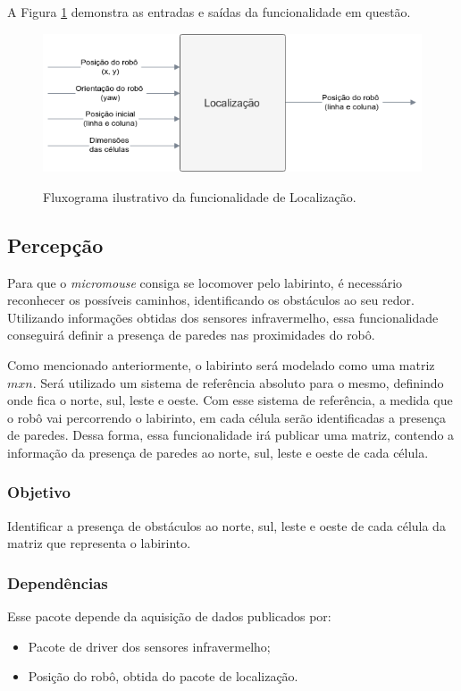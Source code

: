 A Figura \ref{fig:especificacao_funcional_localizacao} demonstra as entradas e saídas da funcionalidade em questão.

\begin{figure}[H]
	\centering
	\caption{Fluxograma ilustrativo da funcionalidade de Localização.}
	\includegraphics[width=1\textwidth]
	{Figures/especificacao_funcional_localizacao}
	\label{fig:especificacao_funcional_localizacao}
\end{figure}

\subsection{Percepção}
\label{ssec:funcionalidade_percepcao} 
Para que o \textit{micromouse} consiga se locomover pelo labirinto, é necessário reconhecer os possíveis caminhos, identificando os obstáculos ao seu redor. Utilizando informações obtidas dos sensores infravermelho, essa funcionalidade conseguirá definir a presença de paredes nas proximidades do robô.
 
Como mencionado anteriormente, o labirinto será modelado como uma matriz $mxn$. Será utilizado um sistema de referência absoluto para o mesmo, definindo onde fica o norte, sul, leste e oeste. Com esse sistema de referência, a medida que o robô vai percorrendo o labirinto, em cada célula serão identificadas a presença de paredes. Dessa forma, essa funcionalidade irá publicar uma matriz, contendo a informação da presença de paredes ao norte, sul, leste e oeste de cada célula.

\subsubsection{Objetivo}
Identificar a presença de obstáculos ao norte, sul, leste e oeste de cada célula da matriz que representa o labirinto.

\subsubsection{Dependências}
Esse pacote depende da aquisição de dados publicados por:
\begin{itemize}
	\item Pacote de driver dos sensores infravermelho;
	\item Posição do robô, obtida do pacote de localização. 
\end{itemize}

